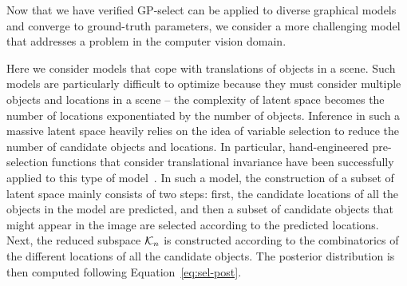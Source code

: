 Now that we have verified GP-select can be applied to diverse graphical models and converge to ground-truth parameters, we consider a more challenging model that addresses a problem in the computer vision domain.

Here we consider models that cope with translations of objects in a scene.
Such models are particularly difficult to optimize because they must consider multiple objects and locations in a scene -- the complexity of latent space becomes the number of locations exponentiated by the number of objects.
Inference in such a massive latent space heavily relies on the idea of variable selection to reduce the number of candidate objects and locations. In particular, hand-engineered pre-selection functions that consider translational invariance have been successfully applied to this type of model~\citep{DaiLucke2012b,DaiLucke2014,DaiEtAl2013}.
%
In such a model, the construction of a subset of latent space mainly consists of two steps: first, the candidate locations of all the objects in the model are predicted, and then a subset of candidate objects that might appear in the image are selected according to the predicted locations.  Next, the reduced subspace $\mathcal{K}_{n}$ is constructed according to the combinatorics of the different locations of all the candidate objects.
The posterior distribution is then computed following Equation~\eqref{eq:sel-post}.

